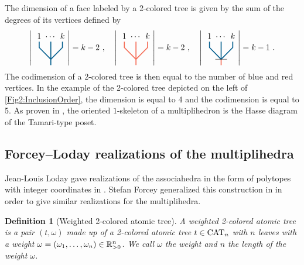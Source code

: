 \documentclass[10pt]{amsart}
\newtheorem{definition}{Definition}[section]
\theoremstyle{remark}
\begin{document}
The dimension of a face labeled by a 2-colored tree is given by the sum of the degrees of its vertices defined by 
\[
\left|{\vcenter{\hbox{
\begin{tikzpicture}[scale=0.5]
\draw[very thick, MidnightBlue] (0,-0.5) -- (0,1.5);
\draw[very thick, MidnightBlue] (0,0) -- (-1,1)--(-1,1.5);
\draw[very thick, MidnightBlue] (0,0) -- (1,1)--(1,1.5);
\draw (1,1.5) node[above] {$k$};
\draw (-1,1.5) node[above] {$1$};
\draw (0,1.5) node[above] {$\cdots$};
\end{tikzpicture}}}}\right|=k-2\ , \quad 
\left|{\vcenter{\hbox{
\begin{tikzpicture}[scale=0.5]
\draw[very thick, Red!60] (0,-0.5) -- (0,1.5);
\draw[very thick, Red!60] (0,0) -- (-1,1)--(-1,1.5);
\draw[very thick, Red!60] (0,0) -- (1,1)--(1,1.5);
\draw (1,1.5) node[above] {$k$};
\draw (-1,1.5) node[above] {$1$};
\draw (0,1.5) node[above] {$\cdots$};
\end{tikzpicture}}}}\right|=k-2\ , \quad 
\left|{\vcenter{\hbox{
\begin{tikzpicture}[scale=0.5]
\draw[very thick, MidnightBlue] (0,0) -- (0,1.5);
\draw[very thick, MidnightBlue] (0,0) -- (-1,1)--(-1,1.5);
\draw[very thick, MidnightBlue] (0,0) -- (1,1)--(1,1.5);
\draw[very thick, Red!60] (0,0) -- (0,-0.5);
\draw (-0.5,0)--(0.5,0);
\draw (1,1.5) node[above] {$k$};
\draw (-1,1.5) node[above] {$1$};
\draw (0,1.5) node[above] {$\cdots$};
\end{tikzpicture}}}}\right|=k-1\ .
\]
The codimension of a 2-colored tree is then equal to the number of blue and red vertices. 
In the example of the 2-colored tree depicted on the left of \cref{Fig2:InclusionOrder}, the dimension is equal to 4 and the codimension is equal to 5. 
As proven in \cite[Proposition 117]{CP22}, the oriented $1$-skeleton of a multiplihedron is the Hasse diagram of the Tamari-type poset. 


\subsection{Forcey--Loday realizations of the multiplihedra}
Jean-Louis Loday gave realizations of the associahedra in the form of polytopes with integer coordinates in \cite{Loday04a}. 
Stefan Forcey generalized this construction in \cite{Forcey08} in order to give similar realizations for the multiplihedra. 

\begin{definition}[Weighted 2-colored atomic tree]
A \emph{weighted 2-colored atomic tree} is a pair $(t, \omega)$ made up of a 2-colored atomic tree $t\in \mathrm{CAT}_{n}$ with $n$ leaves with a weight $\omega= (\omega_1, \ldots, \omega_n) \in \mathbb{R}_{>0}^n$. 
We call $\omega$ the \emph{weight} and $n$ the \emph{length} of the weight $\omega$.
\end{definition}
\end{document}

